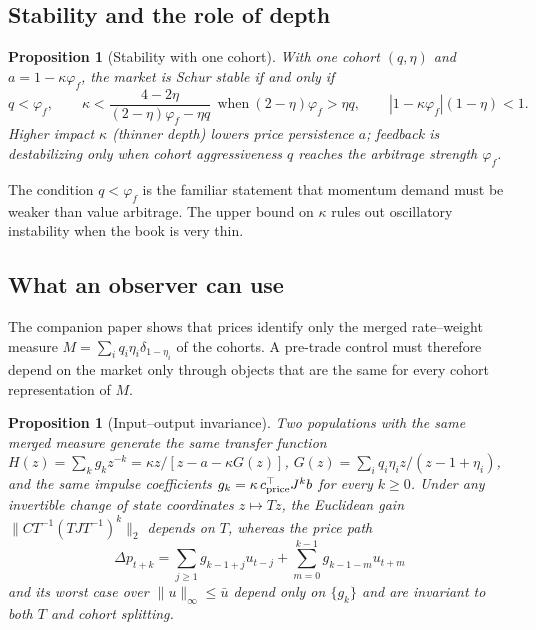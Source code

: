 \documentclass[12pt]{article}
\newtheorem{proposition}[theorem]{Proposition}
\theoremstyle{definition}
\theoremstyle{remark}
\begin{document}
\subsection{Stability and the role of depth}

\begin{proposition}[Stability with one cohort]\label{prop:jury}
With one cohort $(q,\eta)$ and $a=1-\kappa\varphi_f$, the market is Schur stable if and only if
\begin{equation}\label{eq:jury}
q<\varphi_f,\qquad \kappa<\frac{4-2\eta}{(2-\eta)\varphi_f-\eta q}\ \ \text{when}\ (2-\eta)\varphi_f>\eta q,\qquad |1-\kappa\varphi_f|(1-\eta)<1 .
\end{equation}
Higher impact $\kappa$ (thinner depth) lowers price persistence $a$; feedback is destabilizing only when cohort aggressiveness $q$ reaches the arbitrage strength $\varphi_f$.
\end{proposition}

The condition $q<\varphi_f$ is the familiar statement that momentum demand must be weaker than value arbitrage. The upper bound on $\kappa$ rules out oscillatory instability when the book is very thin.

\subsection{What an observer can use}

The companion paper shows that prices identify only the merged rate--weight measure $M=\sum_iq_i\eta_i\delta_{1-\eta_i}$ of the cohorts. A pre-trade control must therefore depend on the market only through objects that are the same for every cohort representation of $M$.

\begin{proposition}[Input--output invariance]\label{prop:invariance}
Two populations with the same merged measure generate the same transfer function $H(z)=\sum_kg_kz^{-k}=\kappa z/[z-a-\kappa G(z)]$, $G(z)=\sum_iq_i\eta_iz/(z-1+\eta_i)$, and the same impulse coefficients $g_k=\kappa\,c_{\rm price}^\top J^kb$ for every $k\ge0$. Under any invertible change of state coordinates $z\mapsto Tz$, the Euclidean gain $\|CT^{-1}(TJT^{-1})^k\|_2$ depends on $T$, whereas the price path
\[
\Delta p_{t+k}=\sum_{j\ge1}g_{k-1+j}u_{t-j}+\sum_{m=0}^{k-1}g_{k-1-m}u_{t+m}
\]
and its worst case over $\|u\|_\infty\le\bar u$ depend only on $\{g_k\}$ and are invariant to both $T$ and cohort splitting.
\end{proposition}
\end{document}
